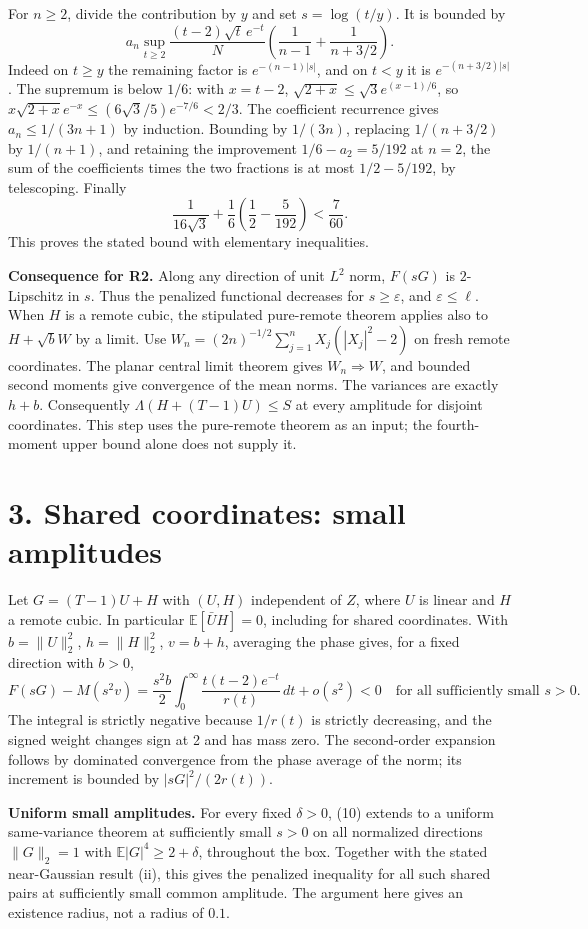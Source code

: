 \documentclass[11pt]{article}
\newcommand{\E}{\mathbb E}
\newcommand{\dd}{\,d}
\newcommand{\head}[1]{\section*{#1}}
\begin{document}
For \(n\ge2\), divide the contribution by \(y\) and set \(s=\log(t/y)\).
It is bounded by
\[
 a_n \sup_{t\ge2}\frac{(t-2)\sqrt t\,e^{-t}}N
       \left(\frac1{n-1}+\frac1{n+3/2}\right).
\]
Indeed on \(t\ge y\) the remaining factor is \(e^{-(n-1)|s|}\), and on \(t<y\)
it is \(e^{-(n+3/2)|s|}\). The supremum is below \(1/6\): with \(x=t-2\),
\(\sqrt{2+x}\le\sqrt3 e^{(x-1)/6}\), so \(x\sqrt{2+x}e^{-x}\le
(6\sqrt3/5)e^{-7/6}<2/3\).
The coefficient recurrence gives \(a_n\le1/(3n+1)\) by induction. Bounding by
\(1/(3n)\), replacing \(1/(n+3/2)\) by \(1/(n+1)\), and retaining the improvement
\(1/6-a_2=5/192\) at \(n=2\), the sum of the coefficients times the two fractions is
at most \(1/2-5/192\), by telescoping. Finally
\[
 \frac1{16\sqrt3}+\frac16\left(\frac12-\frac5{192}\right)<\frac7{60}.
\]
This proves the stated bound with elementary inequalities.

\textbf{Consequence for R2.} Along any direction of unit \(L^2\) norm, \(F(sG)\)
is \(2\)-Lipschitz in \(s\). Thus the penalized functional decreases for
\(s\ge\varepsilon\), and \(\varepsilon\le\ell\). When \(H\) is a remote cubic,
the stipulated pure-remote theorem applies also to \(H+\sqrt b W\) by a limit.
Use \(W_n=(2n)^{-1/2}\sum_{j=1}^n X_j(|X_j|^2-2)\) on fresh remote coordinates.
The planar central limit theorem gives \(W_n\Rightarrow W\), and bounded second
moments give convergence of the mean norms. The variances are exactly \(h+b\).
Consequently \(\Lambda(H+(T-1)U)\le S\) at every amplitude for disjoint coordinates.
This step uses the pure-remote theorem as an input; the fourth-moment upper bound
alone does not supply it.

\newpage
\head{3. Shared coordinates: small amplitudes}
Let \(G=(T-1)U+H\) with \((U,H)\) independent of \(Z\), where \(U\) is linear
and \(H\) a remote cubic. In particular \(\E[\bar U H]=0\), including for shared
coordinates. With \(b=\|U\|_2^2\), \(h=\|H\|_2^2\), \(v=b+h\), averaging the
phase gives, for a fixed direction with \(b>0\),
\[
 F(sG)-M(s^2v)=\frac{s^2 b}{2}
       \int_0^\infty \frac{t(t-2)e^{-t}}{r(t)}\dd t+o(s^2)<0
 \quad\text{for all sufficiently small }s>0.                              \tag{10}
\]
The integral is strictly negative because \(1/r(t)\) is strictly decreasing,
and the signed weight changes sign at 2 and has mass zero. The second-order
expansion follows by dominated convergence from the phase average of the norm;
its increment is bounded by \(|sG|^2/(2r(t))\).

\textbf{Uniform small amplitudes.} For every fixed \(\delta>0\), (10) extends
to a uniform same-variance theorem at sufficiently small \(s>0\) on all normalized
directions \(\|G\|_2=1\) with \(\E|G|^4\ge2+\delta\), throughout the box.
Together with the stated near-Gaussian result (ii), this gives the penalized
inequality for all such shared pairs at sufficiently small common amplitude.
The argument here gives an existence radius, not a radius of \(0.1\).
\end{document}
